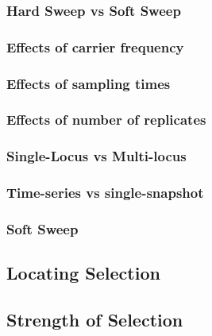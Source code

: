 \subsubsection{Hard Sweep vs Soft Sweep}
\subsubsection{Effects of carrier frequency}
\subsubsection{Effects of sampling times}
\subsubsection{Effects of number of replicates}
\subsubsection{Single-Locus vs Multi-locus}
\subsubsection{Time-series vs single-snapshot}

\subsubsection{Soft Sweep}

\subsection{Locating Selection}

\subsection{Strength of  Selection}






